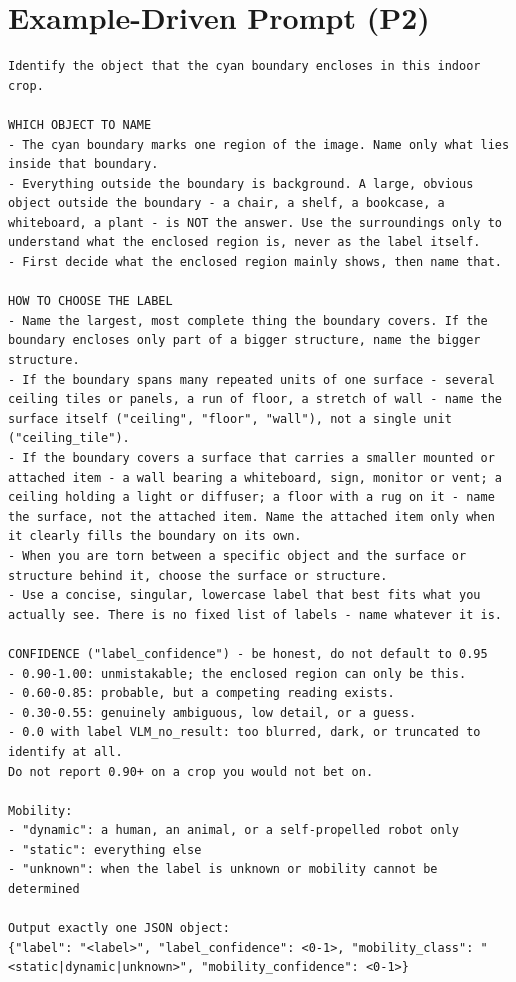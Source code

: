\section{Example-Driven Prompt (P2)}
\label{app:vlm_prompt_p2}
\begin{lstlisting}[style=promptstyle]
Identify the object that the cyan boundary encloses in this indoor crop.

WHICH OBJECT TO NAME
- The cyan boundary marks one region of the image. Name only what lies inside that boundary.
- Everything outside the boundary is background. A large, obvious object outside the boundary - a chair, a shelf, a bookcase, a whiteboard, a plant - is NOT the answer. Use the surroundings only to understand what the enclosed region is, never as the label itself.
- First decide what the enclosed region mainly shows, then name that.

HOW TO CHOOSE THE LABEL
- Name the largest, most complete thing the boundary covers. If the boundary encloses only part of a bigger structure, name the bigger structure.
- If the boundary spans many repeated units of one surface - several ceiling tiles or panels, a run of floor, a stretch of wall - name the surface itself ("ceiling", "floor", "wall"), not a single unit ("ceiling_tile").
- If the boundary covers a surface that carries a smaller mounted or attached item - a wall bearing a whiteboard, sign, monitor or vent; a ceiling holding a light or diffuser; a floor with a rug on it - name the surface, not the attached item. Name the attached item only when it clearly fills the boundary on its own.
- When you are torn between a specific object and the surface or structure behind it, choose the surface or structure.
- Use a concise, singular, lowercase label that best fits what you actually see. There is no fixed list of labels - name whatever it is.

CONFIDENCE ("label_confidence") - be honest, do not default to 0.95
- 0.90-1.00: unmistakable; the enclosed region can only be this.
- 0.60-0.85: probable, but a competing reading exists.
- 0.30-0.55: genuinely ambiguous, low detail, or a guess.
- 0.0 with label VLM_no_result: too blurred, dark, or truncated to identify at all.
Do not report 0.90+ on a crop you would not bet on.

Mobility:
- "dynamic": a human, an animal, or a self-propelled robot only
- "static": everything else
- "unknown": when the label is unknown or mobility cannot be determined

Output exactly one JSON object:
{"label": "<label>", "label_confidence": <0-1>, "mobility_class": "<static|dynamic|unknown>", "mobility_confidence": <0-1>}


\end{lstlisting}
